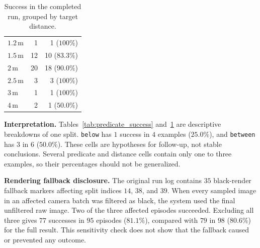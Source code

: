 \begin{table}[t]
\begin{minipage}[t]{0.48\textwidth}
\begin{tabular}{lrr}
$1.2\,\mathrm{m}$ & 1  & 1 ($100\%$) \\
$1.5\,\mathrm{m}$ & 12 & 10 ($83.3\%$) \\
$2\,\mathrm{m}$   & 20 & 18 ($90.0\%$) \\
$2.5\,\mathrm{m}$ & 3  & 3 ($100\%$) \\
$3\,\mathrm{m}$   & 1  & 1 ($100\%$) \\
$4\,\mathrm{m}$   & 2  & 1 ($50.0\%$) \\
\bottomrule
\end{tabular}
\caption{Success in the completed run, grouped by target distance.}
\label{tab:distance_success}
\end{minipage}

\vspace{3pt}
\parbox{\textwidth}{\footnotesize\textbf{Interpretation.}
Tables~\ref{tab:predicate_success} and~\ref{tab:distance_success} are descriptive breakdowns of one split. \texttt{below} has $1$ success in $4$ examples ($25.0\%$), and \texttt{between} has $3$ in $6$ ($50.0\%$). These cells are hypotheses for follow-up, not stable conclusions. Several predicate and distance cells contain only one to three examples, so their percentages should not be generalized.}
\end{table}

\textbf{Rendering fallback disclosure.}
The original run log contains $35$ black-render fallback markers affecting split indices $14$, $38$, and $39$. When every sampled image in an affected camera batch was filtered as black, the system used the final unfiltered raw image. Two of the three affected episodes succeeded. Excluding all three gives $77$ successes in $95$ episodes ($81.1\%$), compared with $79$ in $98$ ($80.6\%$) for the full result. This sensitivity check does not show that the fallback caused or prevented any outcome.

